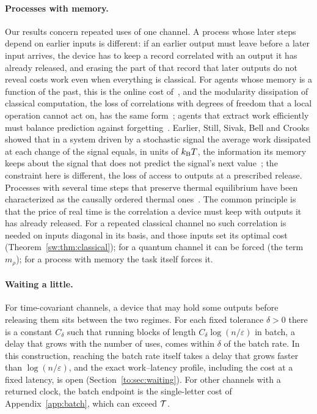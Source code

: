 \paragraph{Processes with memory.} Our results concern repeated uses of one channel. A process whose later steps depend on earlier inputs is different: if an earlier output must leave before a later input arrives, the device has to keep a record correlated with an output it has already released, and erasing the part of that record that later outputs do not reveal costs work even when everything is classical. For agents whose memory is a function of the past, this is the online cost of~\cite{Thompson25}, and the modularity dissipation of classical computation, the loss of correlations with degrees of freedom that a local operation cannot act on, has the same form~\cite{BMC18}; agents that extract work efficiently must balance prediction against forgetting~\cite{Fiderer26}. Earlier, Still, Sivak, Bell and Crooks showed that in a system driven by a stochastic signal the average work dissipated at each change of the signal equals, in units of $k_{\mathrm B} T$, the information its memory keeps about the signal that does not predict the signal's next value~\cite{Still12}; the constraint here is different, the loss of access to outputs at a prescribed release. Processes with several time steps that preserve thermal equilibrium have been characterized as the causally ordered thermal ones~\cite{Milz26}. The common principle is that the price of real time is the correlation a device must keep with outputs it has already released. For a repeated classical channel no such correlation is needed on inputs diagonal in its basis, and those inputs set its optimal cost (Theorem~\ref{sw:thm:classical}); for a quantum channel it can be forced (the term $m_\rho$); for a process with memory the task itself forces it.

\paragraph{Waiting a little.} For time-covariant channels, a device that may hold some outputs before releasing them sits between the two regimes. For each fixed tolerance $\delta>0$ there is a constant $C_\delta$ such that running blocks of length $C_\delta\log(n/\varepsilon)$ in batch, a delay that grows with the number of uses, comes within $\delta$ of the batch rate. In this construction, reaching the batch rate itself takes a delay that grows faster than $\log(n/\varepsilon)$, and the exact work--latency profile, including the cost at a fixed latency, is open (Section~\ref{to:sec:waiting}). For other channels with a returned clock, the batch endpoint is the single-letter cost of Appendix~\ref{app:batch}, which can exceed $\mathcal T$.

